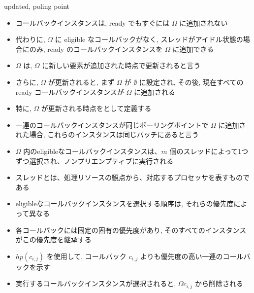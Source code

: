 \begin{frame}{updated, poling point}
    \begin{itemize}
        \item コールバックインスタンスは, ready でもすぐには $\Omega$ に追加されない
        \item 代わりに, $\Omega$ に eligible なコールバックがなく, スレッドがアイドル状態の場合にのみ, ready のコールバックインスタンスを $\Omega$ に追加できる
        \item $\Omega$ は, $\Omega$ に新しい要素が追加された時点で更新されると言う
        \item さらに, $\Omega$ が更新されると, まず $\Omega$ が $\emptyset$ に設定され, その後, 現在すべての ready コールバックインスタンスが $\Omega$ に追加される
        \item 特に, $\Omega$ が更新される時点をとして定義する
        \item 一連のコールバックインスタンスが同じポーリングポイントで $\Omega$ に追加された場合, これらのインスタンスは同じバッチにあると言う
    \end{itemize}
\end{frame}

\begin{frame}{}
    \begin{itemize}
        \item $\Omega$ 内のeligibleなコールバックインスタンスは、$m$ 個のスレッドによって1つずつ選択され、ノンプリエンプティブに実行される
        \item スレッドとは、処理リソースの観点から、対応するプロセッサを表すものである
    \end{itemize}
\end{frame}

\begin{frame}{}
    \begin{itemize}
        \item eligibleなコールバックインスタンスを選択する順序は, それらの優先度によって異なる
        \item 各コールバックには固定の固有の優先度があり, そのすべてのインスタンスがこの優先度を継承する
        \item $h p\left(c_{i, j}\right)$ を使用して, コールバック $c_{i, j}$ よりも優先度の高い一連のコールバックを示す
        \item 実行するコールバックインスタンスが選択されると, $\Omega  c_{i, j}$ から削除される
    \end{itemize}
\end{frame}

